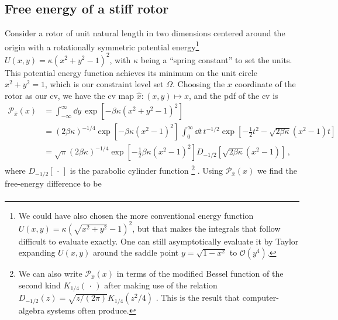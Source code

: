 \begin{subappendices}
\label{sub:subsection name}

\subsection*{Free energy of a stiff rotor}

Consider a rotor of unit natural length in two dimensions centered around the origin with a rotationally symmetric potential energy\footnote{We could have also chosen the more conventional energy function $U(x, y) = \kappa(\sqrt{x^2 + y^2} - 1)^2$, but that makes the integrals that follow difficult to evaluate exactly.  One can still asymptotically evaluate it by Taylor expanding $U(x, y)$ around the saddle point $y = \sqrt{1 - x^2}$ to $\mathcal{O}(y^4)$.} $U(x, y) = \kappa(x^2 + y^2 - 1)^2$, with $\kappa$ being a ``spring constant'' to set the units.
This potential energy function achieves its minimum on the unit circle $x^2 + y^2 = 1$, which is our constraint level set $\Omega$.
Choosing the $x$ coordinate of the rotor as our \ac{cv}, we have the \ac{cv} map $\hat{x}: (x,y) \mapsto x$, and the \ac{pdf} of the \ac{cv} is
%
\begin{equation}
  \begin{aligned}
    \mathscr{P}_{\hat{x}}(x) &= \int_{-\infty}^{\infty} \dd{y}\, \exp\left[-\beta\kappa(x^2 + y^2 - 1)^2\right]\\
                             &= (2\beta\kappa)^{-1/4}\exp\left[-\beta\kappa(x^2 - 1)^2\right]\,\int_{0}^{\infty} \dd{t}\,t^{-1/2}\exp\left[-\tfrac{1}{2}t^2 - \sqrt{2\beta\kappa}(x^2 - 1)t\right]\\
                             &= \sqrt{\pi}(2\beta\kappa)^{-1/4}\exp\left[-\tfrac{1}{2}\beta\kappa(x^2 - 1)^2\right]D_{-1/2}\left[\sqrt{2\beta\kappa}(x^2 - 1)\right]\,,
                             \label{eq:rotor_pdf}
  \end{aligned}
\end{equation}
%
where $D_{-1/2}[\,\cdot\,]$ is the parabolic cylinder function%
\footnote{We can also write $\mathscr{P}_{\hat{x}}(x)$ in terms of the modified Bessel function of the second kind $K_{1/4}(\,\cdot\,)$ after making use of the relation $D_{-1/2}(z) = \sqrt{z/(2\pi)}K_{1/4}(z^2/4)$ \cite[Eq.~12.7.10]{olver2010}.
This is the result that computer-algebra systems often produce.} \cite[Eq.~12.5.1]{olver2010}.
Using $\mathscr{P}_{\hat{x}}(x)$ we find the free-energy difference to be
\begin{equation}
\begin{aligned}\label{eq:rotor_exact_a}

\end{aligned}
\end{equation}
\end{subappendices}
